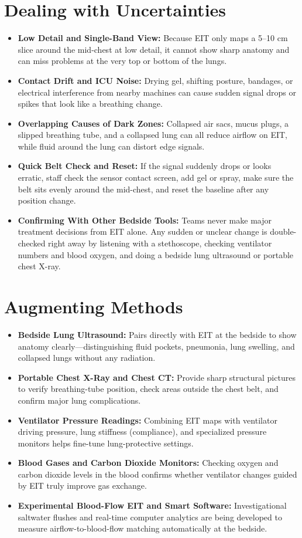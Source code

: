 \section{Dealing with Uncertainties}
\begin{itemize}
    \item \textbf{Low Detail and Single-Band View:} Because EIT only maps a 5--10 cm slice around the mid-chest at low detail, it cannot show sharp anatomy and can miss problems at the very top or bottom of the lungs.
    \item \textbf{Contact Drift and ICU Noise:} Drying gel, shifting posture, bandages, or electrical interference from nearby machines can cause sudden signal drops or spikes that look like a breathing change.
    \item \textbf{Overlapping Causes of Dark Zones:} Collapsed air sacs, mucus plugs, a slipped breathing tube, and a collapsed lung can all reduce airflow on EIT, while fluid around the lung can distort edge signals.
    \item \textbf{Quick Belt Check and Reset:} If the signal suddenly drops or looks erratic, staff check the sensor contact screen, add gel or spray, make sure the belt sits evenly around the mid-chest, and reset the baseline after any position change.
    \item \textbf{Confirming With Other Bedside Tools:} Teams never make major treatment decisions from EIT alone. Any sudden or unclear change is double-checked right away by listening with a stethoscope, checking ventilator numbers and blood oxygen, and doing a bedside lung ultrasound or portable chest X-ray.
\end{itemize}

\section{Augmenting Methods}
\begin{itemize}
    \item \textbf{Bedside Lung Ultrasound:} Pairs directly with EIT at the bedside to show anatomy clearly---distinguishing fluid pockets, pneumonia, lung swelling, and collapsed lungs without any radiation.
    \item \textbf{Portable Chest X-Ray and Chest CT:} Provide sharp structural pictures to verify breathing-tube position, check areas outside the chest belt, and confirm major lung complications.
    \item \textbf{Ventilator Pressure Readings:} Combining EIT maps with ventilator driving pressure, lung stiffness (compliance), and specialized pressure monitors helps fine-tune lung-protective settings.
    \item \textbf{Blood Gases and Carbon Dioxide Monitors:} Checking oxygen and carbon dioxide levels in the blood confirms whether ventilator changes guided by EIT truly improve gas exchange.
    \item \textbf{Experimental Blood-Flow EIT and Smart Software:} Investigational saltwater flushes and real-time computer analytics are being developed to measure airflow-to-blood-flow matching automatically at the bedside.
\end{itemize}

